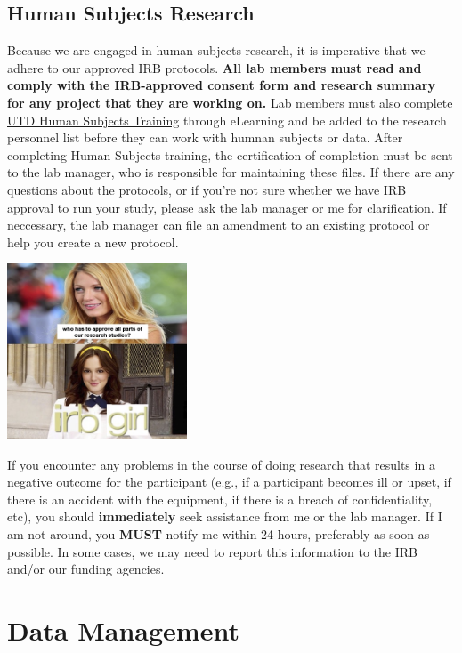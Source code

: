 \documentclass[
]{book}
\begin{document}
\hypertarget{human-subjects-research}{%
\section{Human Subjects Research}\label{human-subjects-research}}

Because we are engaged in human subjects research, it is imperative that we adhere to our approved IRB protocols. \textbf{All lab members must read and comply with the IRB-approved consent form and research summary for any project that they are working on.} Lab members must also complete \href{https://research.utdallas.edu/researchers/human-subjects-research/forms-and-resources/training-and-workshops}{UTD Human Subjects Training} through eLearning and be added to the research personnel list before they can work with humnan subjects or data. After completing Human Subjects training, the certification of completion must be sent to the lab manager, who is responsible for maintaining these files. If there are any questions about the protocols, or if you're not sure whether we have IRB approval to run your study, please ask the lab manager or me for clarification. If neccessary, the lab manager can file an amendment to an existing protocol or help you create a new protocol.

\includegraphics[width=0.4\textwidth,height=\textheight]{images/gg_irb_meme.jpg}

If you encounter any problems in the course of doing research that results in a negative outcome for the participant (e.g., if a participant becomes ill or upset, if there is an accident with the equipment, if there is a breach of confidentiality, etc), you should \textbf{immediately} seek assistance from me or the lab manager. If I am not around, you \textbf{MUST} notify me within 24 hours, preferably as soon as possible. In some cases, we may need to report this information to the IRB and/or our funding agencies.

\hypertarget{data-management}{%
\chapter{Data Management}\label{data-management}}
\end{document}
